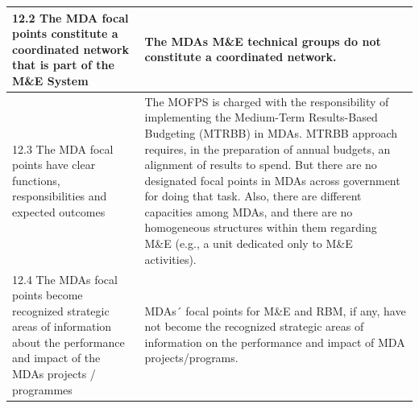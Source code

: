 \documentclass[
  10pt,
]{book}
\begin{document}
\begin{table}
\begin{tabular}[t]{l|l}
\hline
\hspace{1em}12.2 The MDA focal points constitute a coordinated network that is part of the M\&E System & The MDAs M\&E technical groups do not constitute a coordinated network.\\
\hline
\hspace{1em}12.3 The MDA focal points have clear functions, responsibilities and expected outcomes & The MOFPS is charged with the responsibility of implementing the Medium-Term Results-Based Budgeting (MTRBB) in MDAs. MTRBB approach requires, in the preparation of annual budgets, an alignment of results to spend. But there are no designated focal points in MDAs across government for doing that task. Also, there are different capacities among MDAs, and there are no homogeneous structures within them regarding M\&E (e.g., a unit dedicated only to M\&E activities).\\
\hline
\hspace{1em}12.4 The MDAs focal points become recognized strategic areas of information about the performance and impact of the MDAs projects / programmes & MDAs´ focal points for M\&E and RBM, if any, have not become the recognized strategic areas of information on the performance and impact of MDA projects/programs.\\
\hline
\end{tabular}
\end{table}
\end{document}
